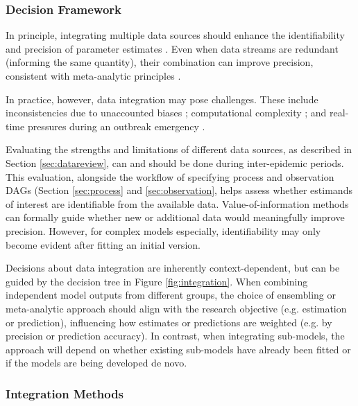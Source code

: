\documentclass{article}
\begin{document}
\subsubsection{Decision Framework}

In principle, integrating multiple data sources should enhance the identifiability and precision of parameter estimates \citep{deangelis2018analysing, lison2024generative, russell2024combined, birrell2025real}. Even when data streams are redundant (informing the same quantity), their combination can improve precision, consistent with meta-analytic principles \citep{deangelis2018analysing,borenstein2021introduction}. 

In practice, however, data integration may pose challenges. These include inconsistencies due to unaccounted biases \citep{presanis2013conflict,knock2021key, Ward2024-sp, corbella2022inferring}; computational complexity \citep{corbella2022inferring}; and real-time pressures during an outbreak emergency \citep{mccaw2023role}.

Evaluating the strengths and limitations of different data sources, as described in Section \ref{sec:datareview}, can and should be done during inter-epidemic periods. This evaluation, alongside the workflow of specifying process and observation DAGs (Section \ref{sec:process} and \ref{sec:observation}, helps assess whether estimands of interest are identifiable from the available data. Value-of-information methods \citep{jackson2019value,heath2024value} can formally guide whether new or additional data would meaningfully improve precision. However, for complex models especially, identifiability may only become evident after fitting an initial version.

Decisions about data integration are inherently context-dependent, but can be guided by the decision tree in Figure \ref{fig:integration}. When combining independent model outputs from different groups, the choice of ensembling or meta-analytic approach should align with the research objective (e.g. estimation or prediction), influencing how estimates or predictions are weighted (e.g. by precision or prediction accuracy). In contrast, when integrating sub-models, the approach will depend on whether existing sub-models have already been fitted or if the models are being developed de novo.

\subsubsection{Integration Methods}
\end{document}
